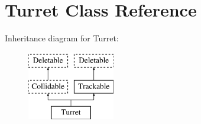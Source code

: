 \hypertarget{class_turret}{\section{Turret Class Reference}
\label{class_turret}
}
Inheritance diagram for Turret\+:\begin{figure}[H]
\begin{center}
\leavevmode
\includegraphics[height=3.000000cm]{class_turret}
\end{center}
\end{figure}
